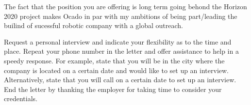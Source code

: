 \documentclass[11pt, a4paper]{awesome-cv}
\begin{document}
\begin{cvletter}
The fact that the position you are offering is long term going behond the Horizon 2020 project 
makes Ocado in par with my ambitions of being part/leading the builind of 
sucessful robotic company with a global outreach. 



Request a personal interview and indicate your flexibility as to the
time and place. Repeat your phone number in the letter and offer assistance to help in a
speedy response. For example, state that you will be in the city where the company is located
on a certain date and would like to set up an interview. Alternatively, state that you will call
on a certain date to set up an interview. End the letter by thanking the employer for taking
time to consider your credentials.

\end{cvletter}

\makeletterclosing
\end{document}
